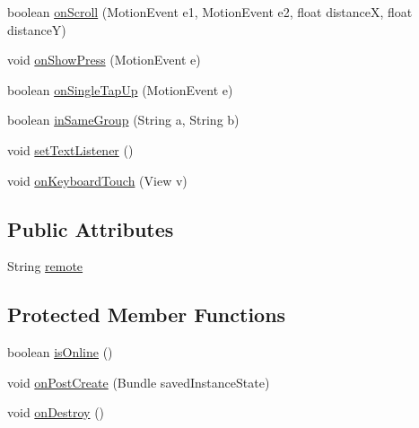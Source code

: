 \begin{DoxyCompactItemize}
\item 
boolean \hyperlink{classcom_1_1axcoto_1_1shinjuku_1_1sushi_1_1_main_activity_af912304fa5a847e1231b71015c2ed06a}{on\-Scroll} (\-Motion\-Event e1, \-Motion\-Event e2, float distance\-X, float distance\-Y)
\item 
void \hyperlink{classcom_1_1axcoto_1_1shinjuku_1_1sushi_1_1_main_activity_a929cec72582aad79985fd2927344b9c7}{on\-Show\-Press} (\-Motion\-Event e)
\item 
boolean \hyperlink{classcom_1_1axcoto_1_1shinjuku_1_1sushi_1_1_main_activity_a05333c5dbd12d347d100d8cb029e4530}{on\-Single\-Tap\-Up} (\-Motion\-Event e)
\item 
boolean \hyperlink{classcom_1_1axcoto_1_1shinjuku_1_1sushi_1_1_main_activity_a7a4a7cacc073ea0ff6afa3681bee057a}{in\-Same\-Group} (\-String a, \-String b)
\item 
void \hyperlink{classcom_1_1axcoto_1_1shinjuku_1_1sushi_1_1_main_activity_a77655e76f2d14b288f497b9de5f3aaf0}{set\-Text\-Listener} ()
\item 
void \hyperlink{classcom_1_1axcoto_1_1shinjuku_1_1sushi_1_1_main_activity_aaae7f153d5a090ca51e0774398ee7eff}{on\-Keyboard\-Touch} (\-View v)
\end{DoxyCompactItemize}
\subsection*{\-Public \-Attributes}
\begin{DoxyCompactItemize}
\item 
\-String \hyperlink{classcom_1_1axcoto_1_1shinjuku_1_1sushi_1_1_main_activity_a183609665ec025bb030be97c68faa84f}{remote}
\end{DoxyCompactItemize}
\subsection*{\-Protected \-Member \-Functions}
\begin{DoxyCompactItemize}
\item 
boolean \hyperlink{classcom_1_1axcoto_1_1shinjuku_1_1sushi_1_1_main_activity_a3821c1cd1522c78e029c3072845fa49d}{is\-Online} ()
\item 
void \hyperlink{classcom_1_1axcoto_1_1shinjuku_1_1sushi_1_1_main_activity_aa011b85144bb1b697097f7fd5cf261c0}{on\-Post\-Create} (\-Bundle saved\-Instance\-State)
\item 
void \hyperlink{classcom_1_1axcoto_1_1shinjuku_1_1sushi_1_1_main_activity_a8a744b43949a3939f448facad211e3d2}{on\-Destroy} ()
\end{DoxyCompactItemize}
